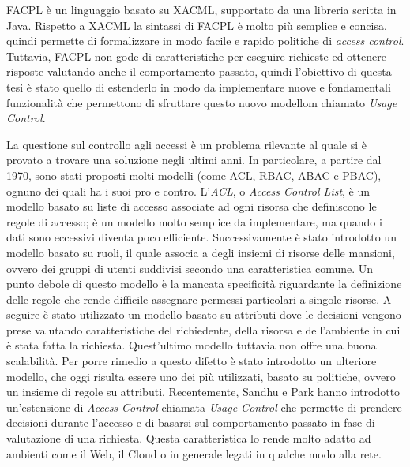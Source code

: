FACPL è un linguaggio basato su XACML, supportato da una libreria
scritta in Java. Rispetto a XACML la sintassi di FACPL è molto più semplice
e concisa, quindi permette di formalizzare in modo facile e rapido
politiche di \textit{access control}. Tuttavia, FACPL non gode di caratteristiche
per eseguire richieste ed ottenere risposte valutando
anche il comportamento passato, quindi l’obiettivo di questa tesi è stato
quello di estenderlo in modo da implementare nuove e fondamentali funzionalità
che permettono di sfruttare questo nuovo modellom chiamato \textit{Usage Control}. \\ \par


La questione sul controllo agli accessi è un problema rilevante al
quale si è provato a trovare una soluzione negli ultimi anni. In particolare,
a partire dal 1970, sono stati proposti molti modelli (come ACL,
RBAC, ABAC e PBAC), ognuno dei quali ha i suoi pro e contro.
L'\textit{ACL}, o \textit{Access Control List}, è un modello basato su liste di accesso associate
ad ogni risorsa che definiscono le regole di accesso; è un modello molto
semplice da implementare, ma quando i dati sono eccessivi diventa
poco efficiente. Successivamente è stato introdotto un modello basato su
ruoli, il quale associa a degli insiemi di risorse delle mansioni, ovvero dei gruppi
di utenti suddivisi secondo una caratteristica comune. Un punto debole
di questo modello è la mancata specificità riguardante la definizione
delle regole che rende difficile assegnare permessi particolari a singole
risorse. A seguire è stato utilizzato un modello basato su attributi dove
le decisioni vengono prese valutando caratteristiche del richiedente,
della risorsa e dell’ambiente in cui è stata fatta la richiesta. Quest’ultimo
modello tuttavia non offre una buona scalabilità. Per porre
rimedio a questo difetto è stato introdotto un ulteriore modello,
che oggi risulta essere uno dei più utilizzati, basato su politiche,
ovvero un insieme di regole su attributi. Recentemente, Sandhu e Park
hanno introdotto un’estensione di \textit{Access Control} chiamata \textit{Usage Control}
che permette di prendere decisioni durante
l’accesso e di basarsi sul comportamento passato in fase di valutazione
di una richiesta. Questa caratteristica lo rende molto adatto ad ambienti come il Web,
il Cloud o in generale legati in qualche modo alla rete.\\ \par


